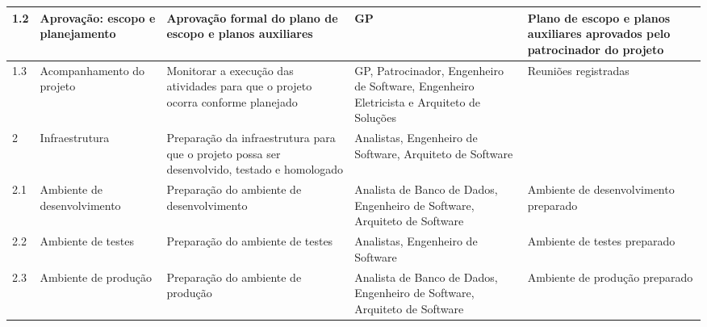 \begin{longtable}{  l  p{}  p{}  p{}  p{}  }
	1.2         & Aprovação: escopo e planejamento                        & Aprovação formal do plano de escopo e planos auxiliares                                                                                                                        & GP                                                                                               & Plano de escopo e planos auxiliares aprovados pelo patrocinador do projeto                               \\*
	\midrule
	1.3         & Acompanhamento do projeto                                 & Monitorar a execução das atividades para que o projeto ocorra conforme planejado                                                                                               & GP, Patrocinador, Engenheiro de Software, Engenheiro Eletricista e Arquiteto de Soluções       & Reuniões registradas                                                                                    \\*
	\midrule
	2           & Infraestrutura                                            & Preparação da infraestrutura para que o projeto possa ser desenvolvido, testado e homologado                                                                                   & Analistas, Engenheiro de Software, Arquiteto de Software                                         &                                                                                                          \\*
	\midrule
	2.1         & Ambiente de desenvolvimento                               & Preparação do ambiente de desenvolvimento                                                                                                                                      & Analista de Banco de Dados, Engenheiro de Software, Arquiteto de Software                        & Ambiente de desenvolvimento preparado                                                                    \\*
	\midrule
	2.2         & Ambiente de testes                                        & Preparação do ambiente de testes                                                                                                                                               & Analistas, Engenheiro de Software                                                                & Ambiente de testes preparado                                                                             \\*
	\midrule
	2.3         & Ambiente de produção                                    & Preparação do ambiente de produção                                                                                                                                           & Analista de Banco de Dados, Engenheiro de Software, Arquiteto de Software                        & Ambiente de produção preparado                                                                         \\*

\end{longtable}
